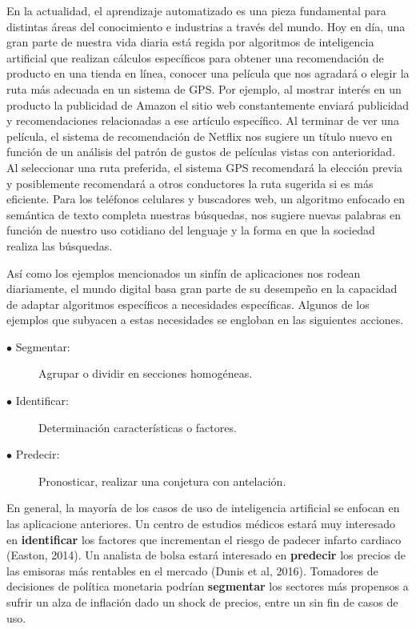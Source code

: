 \documentclass[letterpaper,12pt, spanish, oneside]{book} %
\begin{document}
En la actualidad, el aprendizaje automatizado es una pieza fundamental para distintas áreas del conocimiento e industrias a través del mundo. Hoy en día, una gran parte de nuestra vida diaria está regida por algoritmos de inteligencia artificial que realizan cálculos específicos para obtener una recomendación de producto en una tienda en línea, conocer una película que nos agradará o elegir la ruta más adecuada en un sistema de GPS. Por ejemplo, al mostrar interés en un producto la publicidad de Amazon el sitio web constantemente enviará publicidad y recomendaciones relacionadas a ese artículo específico. Al terminar de ver una película, el sistema de recomendación de Netflix nos sugiere un título nuevo en función de un análisis del patrón de gustos de películas vistas con anterioridad. Al seleccionar una ruta preferida, el sistema GPS recomendará la elección previa y posiblemente recomendará a otros conductores la ruta sugerida si es más eficiente. Para los teléfonos celulares y buscadores web, un algoritmo enfocado en semántica de texto completa nuestras búsquedas, nos sugiere nuevas palabras en función de nuestro uso cotidiano del lenguaje y la forma en que la sociedad realiza las búsquedas.    

Así como los ejemplos mencionados un sinfín de aplicaciones nos rodean diariamente, el mundo digital basa gran parte de su desempeño en la capacidad de adaptar algoritmos específicos a necesidades específicas. Algunos de los ejemplos que subyacen a estas necesidades se engloban en las siguientes acciones.

\begin{description}
\item [$\bullet$ Segmentar:] Agrupar o dividir en secciones homogéneas.
\item [$\bullet$ Identificar:] Determinación características o factores.
\item [$\bullet$ Predecir:] Pronosticar, realizar una conjetura con antelación.
\end{description}

En general, la mayoría de los casos de uso de inteligencia artificial se enfocan en las aplicacione anteriores. Un centro de estudios médicos estará muy interesado en \textbf{identificar} los factores que incrementan el riesgo de padecer infarto cardiaco (Easton, 2014). Un analista de bolsa estará interesado en \textbf{predecir} los precios de las emisoras más rentables en el mercado (Dunis et al, 2016). Tomadores de decisiones de política monetaria podrían \textbf{segmentar} los sectores más propensos a sufrir un alza de inflación dado un shock de precios, entre un sin fin de casos de uso.
\end{document}
